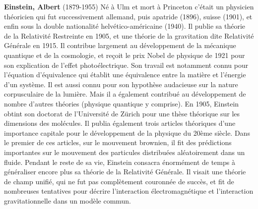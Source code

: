 {}
\label{sec:E}

\textbf{Einstein, Albert} (1879-1955) Né à Ulm et mort à Princeton c'était un physicien théoricien qui fut successivement allemand, puis apatride (1896), suisse (1901), et enfin sous la double nationalité helvético-américaine (1940). Il publie sa théorie de la Relativité Restreinte en 1905, et une théorie de la gravitation dite Relativité Générale en 1915. Il contribue largement au développement de la mécanique quantique et de la cosmologie, et reçoit le prix Nobel de physique de 1921 pour son explication de l'effet photoélectrique. Son travail est notamment connu pour l'équation d'équivalence qui établit une équivalence entre la matière et l'énergie d'un système. Il est aussi connu pour son hypothèse audacieuse sur la nature corpusculaire de la lumière. Mais il a également contribué au développement de nombre d'autres théories (physique quantique y comprise). En 1905, Einstein obtint son doctorat de l'Université de Zürich pour une thèse théorique sur les dimensions des molécules. Il publia également trois articles théoriques d'une importance capitale pour le développement de la physique du 20ème siècle. Dans le premier de ces articles, sur le mouvement brownien, il fit des prédictions importantes sur le mouvement des particules distribuées aléatoirement dans un fluide.  Pendant le reste de sa vie, Einstein consacra énormément de temps à généraliser encore plus sa théorie de la Relativité Générale. Il visait une théorie de champ unifié, qui ne fut pas complètement couronnée de succès, et fit de nombreuses tentatives pour décrire l'interaction électromagnétique et l'interaction gravitationnelle dans un modèle commun.

